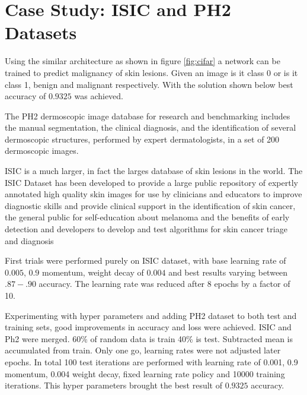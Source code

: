 \documentclass[paper=a4, fontsize=11pt]{scrartcl}
\numberwithin{equation}{section}		%
\numberwithin{figure}{section}			%
\numberwithin{table}{section}			%
\begin{document}
	\section{Case Study: ISIC and PH2 Datasets}
	Using the similar architecture as shown in figure \ref{fig:cifar} a network can be trained to predict malignancy of skin lesions. Given an image is it class 0 or is it class 1, benign and malignant respectively. With the solution shown below best accuracy of $0.9325$ was achieved.
	
	\par The PH2 \cite{PH2} dermoscopic image database for research and benchmarking includes the manual segmentation, the clinical diagnosis, and the identification of several dermoscopic structures, performed by expert dermatologists, in a set of 200 dermoscopic images. 
	
	\par ISIC \cite{ISIC} is a much larger, in fact the larges database of skin lesions in the world. The ISIC Dataset has been developed to provide a large public repository of expertly annotated high quality skin images for use by clinicians and educators to improve diagnostic skills and provide clinical support in the identification of skin cancer, the general public for self-education about melanoma and the benefits of early detection and developers to develop and test algorithms for skin cancer triage and diagnosis
	
	\par First trials were performed purely on ISIC dataset, with base learning rate of $0.005$, $0.9$ momentum, weight decay of $0.004$ and best results varying between $.87 - .90$ accuracy. The learning rate was reduced after 8 epochs by a factor of 10.
	
	\par Experimenting with hyper parameters and adding PH2 dataset to both test and training sets, good improvements in accuracy and loss were achieved. 
	ISIC and Ph2 were merged. 60\% of random data is train 40\% is test. Subtracted mean is accumulated from train. Only one go, learning rates were not adjusted later epochs. In total 100 test iterations are performed with learning rate of 0.001, 0.9 momentum, 0.004 weight decay, fixed learning rate policy and 10000 training iterations. This hyper parameters brought the best result of $0.9325$ accuracy.	
\end{document}
